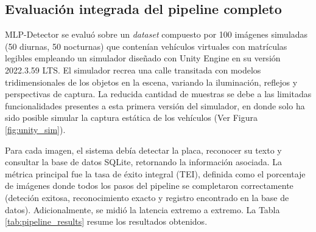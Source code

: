 
\subsection*{Evaluación integrada del pipeline completo}
MLP-Detector se evaluó sobre un \textit{dataset} compuesto por 100 imágenes simuladas (50 diurnas, 50 nocturnas) que contenían vehículos virtuales con matrículas legibles empleando un simulador diseñado con Unity Engine en su versión 2022.3.59 LTS. El simulador recrea una calle transitada con modelos tridimensionales de los objetos en la escena, variando la iluminación, reflejos y perspectivas de captura. La reducida cantidad de muestras se debe a las limitadas funcionalidades presentes a esta primera versión del simulador, en donde solo ha sido posible simular la captura estática de los vehículos (Ver Figura \ref{fig:unity_sim}).

Para cada imagen, el sistema debía detectar la placa, reconocer su texto y consultar la base de datos SQLite, retornando la información asociada. La métrica principal fue la tasa de éxito integral (TEI), definida como el porcentaje de imágenes donde todos los pasos del pipeline se completaron correctamente (deteción exitosa, reconocimiento exacto y registro encontrado en la base de datos). Adicionalmente, se midió la latencia extremo a extremo. La Tabla \ref{tab:pipeline_results} resume los resultados obtenidos.

